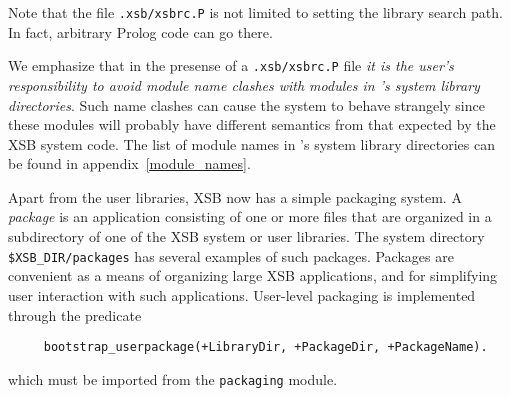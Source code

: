 Note that the file {\verb|.xsb/xsbrc.P|} is not limited to setting the
library search path.  In fact, arbitrary Prolog code can go there.

We emphasize that in the presense of a {\verb|.xsb/xsbrc.P|} file
{\em it is the user's responsibility to avoid module name clashes 
with modules in \ourprolog's system library directories}.
Such name clashes can cause the system to behave strangely since these
modules will probably have different semantics from that expected
by the XSB system code.  The list of module names in
\ourprolog's system library directories can be found in
appendix~\ref{module_names}.

Apart from the user libraries, XSB now has a simple packaging system.
A {\em package\/} is an application consisting of one or more files that
are organized in a subdirectory of one of the XSB system or user libraries.
The system directory \verb|$XSB_DIR/packages| has several examples
of such packages. Packages are convenient as a means of organizing
large XSB applications, and for simplifying user interaction with such
applications. User-level packaging is implemented through the predicate
\begin{verbatim}
     bootstrap_userpackage(+LibraryDir, +PackageDir, +PackageName).
\end{verbatim}
which must be imported from the {\tt packaging} module. 

